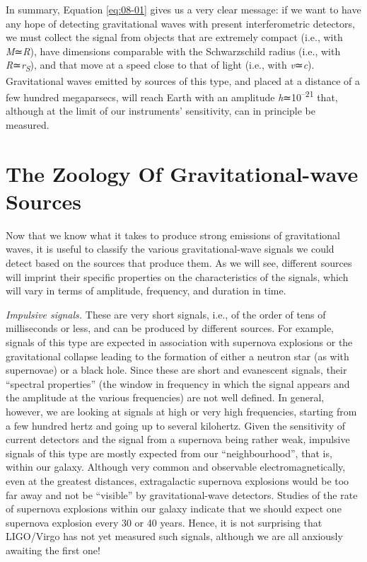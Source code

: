 In summary, Equation \eqref{eq:08-01} gives us a very clear message: if we want to have any hope of
detecting gravitational waves with present interferometric detectors, we must collect
the signal from objects that are extremely compact (i.e., with \emph{M}≃\emph{R}), have
dimensions comparable with the Schwarzschild radius (i.e., with
\emph{R}≃\emph{r\textsubscript{S}}), and that move at a speed close to that of light
(i.e., with \emph{v}≃\emph{c}). Gravitational waves emitted by sources of this type, and
placed at a distance of a few hundred megaparsecs, will reach Earth with an amplitude
\emph{h}≃10\textsuperscript{--21} that, although at the limit of our instruments'
sensitivity, can in principle be measured.

\section{The Zoology Of Gravitational-wave Sources}\label{sec:08-zoology}

Now that we know what it takes to produce strong emissions of gravitational
waves, it is useful to classify the various gravitational-wave
signals we could detect based on the sources that produce them. As we will see,
different sources will imprint their specific properties on the characteristics of the
signals, which will vary in terms of amplitude, frequency, and duration in time.

\emph{Impulsive signals.} These are very short signals, i.e., of the order of tens of
milliseconds or less, and can be produced by different sources. For example, signals of
this type are expected in association with supernova explosions or
the gravitational collapse leading to the formation of either a neutron star (as with
supernovae) or a black hole. Since these are short and evanescent signals, their
``spectral properties'' (the window in frequency in which the signal appears and the
amplitude at the various frequencies) are not well defined. In general, however, we are
looking at signals at high or very high frequencies, starting from a few hundred hertz
and going up to several kilohertz. Given the sensitivity of current detectors and the
signal from a supernova being rather weak, impulsive signals of this type are mostly
expected from our ``neighbourhood'', that is, within our galaxy. Although very common
and observable electromagnetically, even at the greatest distances, extragalactic
supernova explosions would be too far away and not be ``visible'' by gravitational-wave
detectors. Studies of the rate of supernova explosions within our galaxy indicate that
we should expect one supernova explosion every 30 or 40 years. Hence, it is not
surprising that LIGO/Virgo has not yet measured such signals, although we are all
anxiously awaiting the first one!

